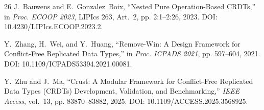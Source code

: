 \documentclass[conference]{IEEEtran}
\begin{document}
\begin{thebibliography}{26}
J.~Bauwens and E.~Gonzalez~Boix, ``Nested Pure Operation-Based CRDTs,'' in \emph{Proc. ECOOP 2023}, LIPIcs 263, Art.~2, pp. 2:1--2:26, 2023. DOI: 10.4230/LIPIcs.ECOOP.2023.2.

Y.~Zhang, H.~Wei, and Y.~Huang, ``Remove-Win: A Design Framework for Conflict-Free Replicated Data Types,'' in \emph{Proc. ICPADS 2021}, pp. 597--604, 2021. DOI: 10.1109/ICPADS53394.2021.00081.

Y.~Zhu and J.~Ma, ``Crust: A Modular Framework for Conflict-Free Replicated Data Types (CRDTs) Development, Validation, and Benchmarking,'' \emph{IEEE Access}, vol.~13, pp. 83870--83882, 2025. DOI: 10.1109/ACCESS.2025.3568925.

\end{thebibliography}
\end{document}
